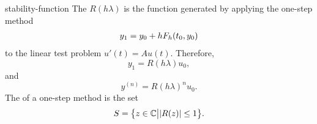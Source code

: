 \begin{Definition}{stability-function}
  The  $R(h \lambda)$ is the function generated by
  applying the one-step method
  \begin{gather*}
    y_1 = y_0 + h F_h(t_0, y_0)
  \end{gather*}
  to the linear test problem $u'(t)=Au(t)$. Therefore,
  \begin{equation}
    y_1 = R(h \lambda) u_0,
  \end{equation}
  and
  \begin{equation}
    y^{(n)} = R(h \lambda)^n u_0.
  \end{equation}
  The  of a one-step method is the set
  \begin{gather}
    S = \bigl\{ z \in \mathbb C \big| \lvert R(z)\rvert \le 1 \bigr\}.
  \end{gather}

\end{Definition}
